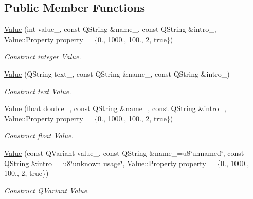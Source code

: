 \subsection*{Public Member Functions}
\begin{DoxyCompactItemize}
\item 
\mbox{\hyperlink{classeven_1_1_value_ace4f4181daf48486843667d315f0d391}{Value}} (int value\+\_\+, const Q\+String \&name\+\_\+, const Q\+String \&intro\+\_\+, \mbox{\hyperlink{structeven_1_1_value_1_1_property}{Value\+::\+Property}} property\+\_\+=\{0., 1000., 100., 2, true\})
\begin{DoxyCompactList}\small\item\em Construct integer \mbox{\hyperlink{classeven_1_1_value}{Value}}. \end{DoxyCompactList}\item 
\mbox{\hyperlink{classeven_1_1_value_a2ea082c2c31a47f3957a864822117580}{Value}} (Q\+String text\+\_\+, const Q\+String \&name\+\_\+, const Q\+String \&intro\+\_\+)
\begin{DoxyCompactList}\small\item\em Construct text \mbox{\hyperlink{classeven_1_1_value}{Value}}. \end{DoxyCompactList}\item 
\mbox{\hyperlink{classeven_1_1_value_a436d089d1ee01eedb8572b9967bc3af8}{Value}} (float double\+\_\+, const Q\+String \&name\+\_\+, const Q\+String \&intro\+\_\+, \mbox{\hyperlink{structeven_1_1_value_1_1_property}{Value\+::\+Property}} property\+\_\+=\{0., 1000., 100., 2, true\})
\begin{DoxyCompactList}\small\item\em Construct float \mbox{\hyperlink{classeven_1_1_value}{Value}}. \end{DoxyCompactList}\item 
\mbox{\hyperlink{classeven_1_1_value_ac9a4fabfe27f2ed4bd75e8e8190ae8cb}{Value}} (const Q\+Variant value\+\_\+, const Q\+String \&name\+\_\+=u8\char`\"{}unnamed\char`\"{}, const Q\+String \&intro\+\_\+=u8\char`\"{}unknown usage\char`\"{}, Value\+::\+Property property\+\_\+=\{0., 1000., 100., 2, true\})
\begin{DoxyCompactList}\small\item\em Construct Q\+Variant \mbox{\hyperlink{classeven_1_1_value}{Value}}. \end{DoxyCompactList}\item 
\mbox{\label{classeven_1_1_value_a14bf3df1793e6488fc626c80d9152253}} 

\end{DoxyCompactItemize}
